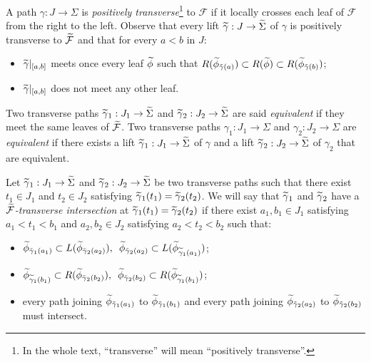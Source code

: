 \documentclass[10pt,a4paper]{article}
\theoremstyle{definition}
\theoremstyle{plain}
\numberwithin{equation}{section}
\numberwithin{figure}{section}
\newcommand{\F}{\mathcal{F}}
\let\oldtilde\tilde
\renewcommand*{\tilde}[1]{\mathchoice{\widetilde{#1}}{\widetilde{#1}}{\oldtilde{#1}}{\oldtilde{#1}}}
\begin{document}
A path $\gamma:J\to\Sigma$ is \emph {positively transverse}\footnote{In the whole text, ``transverse'' will mean ``positively transverse''.} to $\F$ if it locally crosses each leaf of $\F$ from the right to the left. Observe that every lift $\tilde\gamma:J\to\tilde\Sigma$ of $\gamma$ is positively transverse to $\tilde{\F}$ and that for every $a<b$ in $J$:
\begin{itemize}
\item $\tilde\gamma|_{[a,b]}$ meets once every leaf $\tilde\phi$ such that $R(\tilde\phi_{\tilde \gamma(a)})\subset R(\tilde\phi)\subset R(\tilde\phi_{\tilde \gamma(b)})$;
\item $\tilde\gamma|_{[a,b]}$ does not meet any other leaf.
\end{itemize}
Two transverse paths $\tilde\gamma_1:J_1\to\tilde\Sigma$ and $\tilde\gamma_2:J_2\to\tilde\Sigma$ are said \emph{equivalent} if they meet the same leaves of $\tilde{\F}$. Two transverse paths $\gamma_1:J_1\to\Sigma$ and $\gamma_2:J_2\to\Sigma$ are \emph{equivalent} if there exists a lift $\tilde\gamma_1:J_1\to\tilde\Sigma$ of $\gamma$ and a lift $\tilde\gamma_2:J_2\to\tilde\Sigma$ of $\gamma_2$ that are equivalent.

Let $\tilde\gamma_1:J_1\to \tilde\Sigma$ and $\tilde\gamma_2:J_2\to \tilde \Sigma$ be two transverse paths such that there exist $t_1\in J_1$ and $t_2\in J_2$ satisfying $\tilde\gamma_1(t_1)=\tilde\gamma_2(t_2)$. We will say that $\tilde\gamma_1$ and $\tilde\gamma_2$ have a \emph{$\tilde{\F}$-transverse intersection} at $\tilde\gamma_1(t_1)=\tilde\gamma_2(t_2)$ if there exist $a_1, b_1\in J_1$ satisfying $a_1<t_1<b_1$ and $a_2, b_2\in J_2$ satisfying $a_2<t_2<b_2$ such that:
\begin{itemize}
\item $\tilde\phi_{\tilde\gamma_1(a_1)}\subset L(\tilde\phi_{\tilde\gamma_2(a_2)}),\enskip \tilde\phi_{\tilde\gamma_2(a_2)}\subset L(\tilde\phi_{\widetilde\gamma_1(a_1)})$;

\item $\tilde\phi_{\widetilde\gamma_1(b_1)}\subset R(\tilde\phi_{\tilde\gamma_2(b_2)}),\enskip \tilde\phi_{\tilde\gamma_2(b_2)}\subset R(\tilde\phi_{\widetilde\gamma_1(b_1)})$;

\item every path joining $\tilde\phi_{\tilde\gamma_1(a_1)}$ to $\tilde\phi_{\tilde\gamma_1(b_1)}$ and every path joining $\tilde\phi_{\tilde\gamma_2(a_2)}$ to $\tilde\phi_{\tilde\gamma_2(b_2)}$ must intersect.
\end{itemize}
\end{document}
